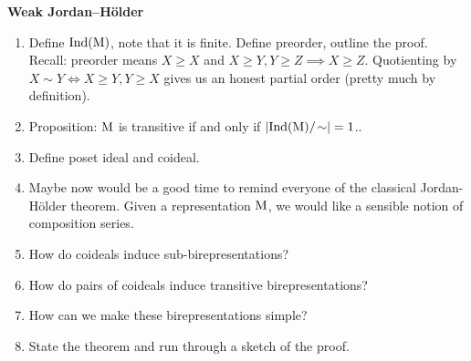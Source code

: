 \noindent\textbf{Weak Jordan--H\"{o}lder}
\begin{enumerate}[label=$\bullet$, leftmargin=1\parindent]
\item Define $\textnormal{Ind}(\textnormal{M})$, note that it is finite. Define preorder, outline the proof. Recall: preorder means $X \geq X$ and $X \geq Y, Y \geq Z \implies X \geq Z$. Quotienting by $X \sim Y \iff X \geq Y, Y \geq X$ gives us an honest partial order (pretty much by definition).
\item Proposition: $\textnormal{M}$ is transitive if and only if $\lvert\textnormal{Ind}(\textnormal{M})/\!\sim\rvert = 1$..
\item Define poset ideal and coideal.
\item Maybe now would be a good time to remind everyone of the classical Jordan-H\"{o}lder theorem. Given a representation $\textnormal{M}$, we would like a sensible notion of composition series.
\item How do coideals induce sub-birepresentations?
\item How do pairs of coideals induce transitive birepresentations?
\item How can we make these birepresentations simple?
\item State the theorem and run through a sketch of the proof.
\end{enumerate}
\newpage

